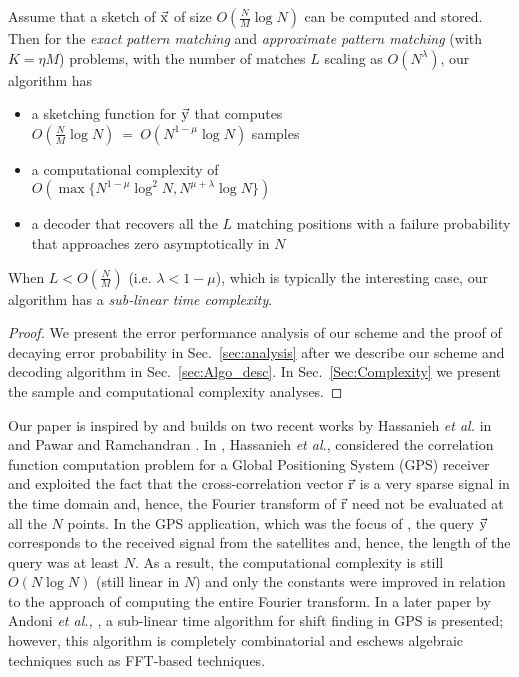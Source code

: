 \begin{theorem}\label{thm:mainresults}
Assume that a sketch of $\vec{\mathrm{x}}$ of size $O(\frac{N}{M} \log N)$ can be computed and stored. Then for the {\it exact pattern matching} and {\it approximate pattern matching} (with $K = \eta M$) problems, with the number of matches $L$ scaling as $O(N^{\lambda})$, our algorithm has
\begin{itemize}
 \item a sketching function for $\vec{\mathrm{y}}$ that computes \\ $O(\frac{N}{M}\log N)~=~ O\left(N^{1-\mu}\log N\right)$ samples
  \item a computational complexity of \\$O\left(\max\{N^{1-\mu}\log^2 N, N^{\mu+\lambda}\log N \}\right)$
  \item a decoder that recovers all the $L$ matching positions with a failure probability that approaches zero asymptotically in $N$
  
 \end{itemize}
When $L<O\left(\frac{N}{M}\right)$ (i.e. $\lambda<1-\mu$), which is typically the interesting case, our algorithm has a {\it sub-linear time complexity}.
\end{theorem}
\begin{proof}
We present the error performance analysis of our scheme and the proof of decaying error probability in Sec.~\ref{sec:analysis} after we describe our scheme and  decoding algorithm in Sec.~\ref{sec:Algo_desc}. In Sec.~\ref{Sec:Complexity} we present the sample and computational complexity analyses.
\end{proof}
Our paper is inspired by and builds on two recent works by Hassanieh {\em {et al.}} in \cite{hassanieh2012faster} and Pawar and Ramchandran \cite{pawar2014robust}. In \cite{hassanieh2012faster}, Hassanieh \emph{et al.}, considered the correlation function computation problem for a Global Positioning System (GPS) receiver and exploited the fact that the cross-correlation vector $\vec{\mathrm{r}}$ is a very sparse signal in the time domain and, hence, the Fourier transform of $\vec{\mathrm{r}}$ need not be evaluated at all the $N$ points. In the GPS application, which was the focus of \cite{hassanieh2012faster}, the query $\vec{\mathrm{y}}$ corresponds to the received signal from the satellites and, hence, the length of the query was at least $N$. As a result, the computational complexity is still $O(N \log N)$ (still linear in $N$) and only the constants were improved in relation to the approach of computing the entire Fourier transform. In a later paper by Andoni {\em et al.,} \cite{andoni2013shift}, a sub-linear time algorithm for shift finding in GPS is presented; however, this algorithm is completely combinatorial and eschews algebraic techniques such as FFT-based techniques.

